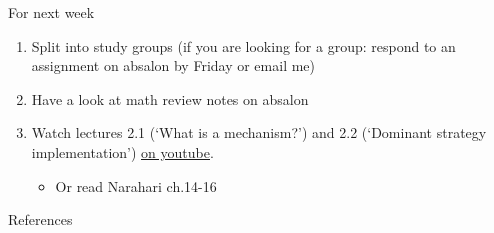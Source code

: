 \documentclass[english,10pt
,aspectratio=169
]{beamer}
\begin{document}
\begin{frame}{For next week}
	\begin{enumerate}
		\item Split into study groups (if you are looking for a group: respond to an assignment on absalon by Friday or email me)
		\item Have a look at math review notes on absalon
		\item Watch lectures 2.1 (`What is a mechanism?') and 2.2 (`Dominant strategy implementation') \href{https://www.youtube.com/playlist?list=PL4pUs4P_j1WasI0kO99OgNNd_hJwpct4D}{\uline{on youtube}}.
		\begin{itemize}
			\item Or read Narahari ch.14-16
		\end{itemize}
	\end{enumerate}
\end{frame}


\appendix
\begin{frame}[allowframebreaks]{References}
	
	
\end{frame}
\end{document}
